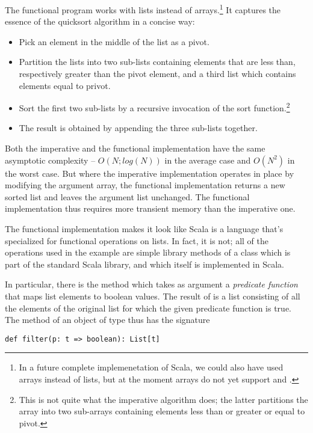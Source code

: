 The functional program works with lists instead of arrays.\footnote{In
a future complete implemenetation of Scala, we could also have used arrays
instead of lists, but at the moment arrays do not yet support
 and \code{:::}.}
It captures the essence of the quicksort algorithm in a concise way:
\begin{itemize}
\item Pick an element in the middle of the list as a pivot.
\item Partition the lists into two sub-lists containing elements that
are less than, respectively greater than the pivot element, and a
third list which contains elements equal to privot.
\item Sort the first two sub-lists by a recursive invocation of
the sort function.\footnote{This is not quite what the imperative algorithm does;
the latter partitions the array into two sub-arrays containing elements
less than or greater or equal to pivot.}
\item The result is obtained by appending the three sub-lists together.
\end{itemize}
Both the imperative and the functional implementation have the same
asymptotic complexity -- $O(N;log(N))$ in the average case and
$O(N^2)$ in the worst case. But where the imperative implementation
operates in place by modifying the argument array, the functional
implementation returns a new sorted list and leaves the argument
list unchanged. The functional implementation thus requires more
transient memory than the imperative one.

The functional implementation makes it look like Scala is a language
that's specialized for functional operations on lists. In fact, it
is not; all of the operations used in the example are simple library
methods of a class  which is part of the standard
Scala library, and which itself is implemented in Scala.

In particular, there is the method  which takes as
argument a {\em predicate function} that maps list elements to
boolean values. The result of  is a list consisting of
all the elements of the original list for which the given predicate
function is true.  The  method of an object of type
 thus has the signature

\begin{lstlisting}
def filter(p: t => boolean): List[t]
\end{lstlisting}

